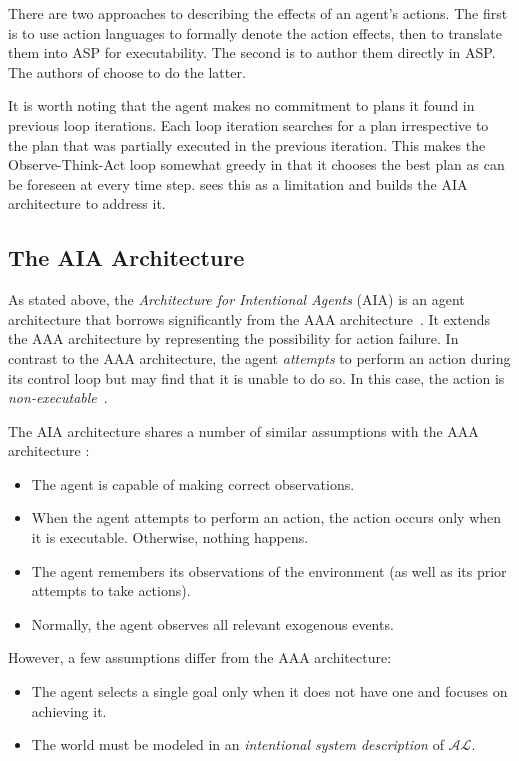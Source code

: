 There are two approaches to describing the effects of an agent's actions.
The first is to use action languages to formally denote the action effects, then to translate them into ASP for executability.
The second is to author them directly in ASP.
The authors of \cite{balduccini_aaa_2008} choose to do the latter.

It is worth noting that the agent makes no commitment to plans it found in previous loop iterations.
Each loop iteration searches for a plan irrespective to the plan that was partially executed in the previous iteration.
This makes the Observe-Think-Act loop somewhat greedy in that it chooses the best plan as can be foreseen at every time step.
\cite{blount_towards_2014} sees this as a limitation and builds the AIA architecture to address it.

\subsection{The AIA Architecture}
\label{subsec:aia_architecture}

As stated above, the \textit{Architecture for Intentional Agents} (AIA) is an agent architecture that borrows significantly from the AAA architecture~\cite{blount_towards_2014}.
It extends the AAA architecture by representing the possibility for action failure.
In contrast to the AAA architecture, the agent \textit{attempts} to perform an action during its control loop but may find that it is unable to do so.
In this case, the action is \textit{non-executable}~\cite{blount_towards_2014}.

The AIA architecture shares a number of similar assumptions with the AAA architecture \cite{blount_towards_2014}:

\begin{itemize}
    \item The agent is capable of making correct observations.
    \item When the agent attempts to perform an action, the action occurs only when it is executable.
        Otherwise, nothing happens.
    \item The agent remembers its observations of the environment (as well as its prior attempts to take actions).
    \item Normally, the agent observes all relevant exogenous events.
\end{itemize}

However, a few assumptions differ from the AAA architecture:

\begin{itemize}
    \item The agent selects a single goal only when it does not have one and focuses on achieving it.
    \item The world must be modeled in an \textit{intentional system description} of $\mathcal{AL}$.
\end{itemize}

